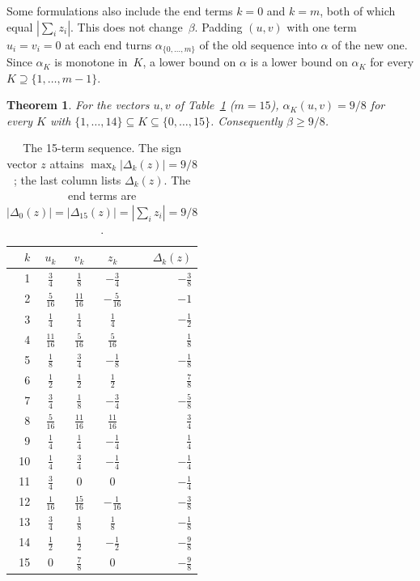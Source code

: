 \documentclass[11pt]{article}
\theoremstyle{plain}
\newtheorem{theorem}{Theorem}
\theoremstyle{definition}
\theoremstyle{remark}
\begin{document}
Some formulations also include the end terms $k=0$ and $k=m$, both of which equal $|\sum_iz_i|$.
This does not change~$\beta$. Padding $(u,v)$ with one term $u_i=v_i=0$ at each end turns $\alpha_{\{0,\dots,m\}}$ of the old sequence into $\alpha$ of the new one.
Since $\alpha_K$ is monotone in~$K$, a lower bound on $\alpha$ is a lower bound on $\alpha_K$ for every $K\supseteq\{1,\dots,m-1\}$.

\begin{theorem}\label{thm:seq}
For the vectors $u,v$ of Table~\ref{tab:seq} ($m=15$), $\alpha_K(u,v)=9/8$ for every $K$ with $\{1,\dots,14\}\subseteq K\subseteq\{0,\dots,15\}$.
Consequently $\beta\ge 9/8$.
\end{theorem}

\begin{table}[t]
\centering
\caption{The 15-term sequence. The sign vector $z$ attains $\max_k|\Delta_k(z)|=9/8$; the last column lists $\Delta_k(z)$. The end terms are $|\Delta_0(z)|=|\Delta_{15}(z)|=|\sum_iz_i|=9/8$.}\label{tab:seq}
\smallskip
\renewcommand{\arraystretch}{1.15}
\begin{tabular}{rcccr}
\toprule
$k$ & $u_k$ & $v_k$ & $z_k$ & $\Delta_k(z)$\\
\midrule
1 & $\tfrac{3}{4}$ & $\tfrac{1}{8}$ & $-\tfrac{3}{4}$ & $-\tfrac{3}{8}$ \\
2 & $\tfrac{5}{16}$ & $\tfrac{11}{16}$ & $-\tfrac{5}{16}$ & $-1$ \\
3 & $\tfrac{1}{4}$ & $\tfrac{1}{4}$ & $\tfrac{1}{4}$ & $-\tfrac{1}{2}$ \\
4 & $\tfrac{11}{16}$ & $\tfrac{5}{16}$ & $\tfrac{5}{16}$ & $\tfrac{1}{8}$ \\
5 & $\tfrac{1}{8}$ & $\tfrac{3}{4}$ & $-\tfrac{1}{8}$ & $-\tfrac{1}{8}$ \\
6 & $\tfrac{1}{2}$ & $\tfrac{1}{2}$ & $\tfrac{1}{2}$ & $\tfrac{7}{8}$ \\
7 & $\tfrac{3}{4}$ & $\tfrac{1}{8}$ & $-\tfrac{3}{4}$ & $-\tfrac{5}{8}$ \\
8 & $\tfrac{5}{16}$ & $\tfrac{11}{16}$ & $\tfrac{11}{16}$ & $\tfrac{3}{4}$ \\
9 & $\tfrac{1}{4}$ & $\tfrac{1}{4}$ & $-\tfrac{1}{4}$ & $\tfrac{1}{4}$ \\
10 & $\tfrac{1}{4}$ & $\tfrac{3}{4}$ & $-\tfrac{1}{4}$ & $-\tfrac{1}{4}$ \\
11 & $\tfrac{3}{4}$ & $0$ & $0$ & $-\tfrac{1}{4}$ \\
12 & $\tfrac{1}{16}$ & $\tfrac{15}{16}$ & $-\tfrac{1}{16}$ & $-\tfrac{3}{8}$ \\
13 & $\tfrac{3}{4}$ & $\tfrac{1}{8}$ & $\tfrac{1}{8}$ & $-\tfrac{1}{8}$ \\
14 & $\tfrac{1}{2}$ & $\tfrac{1}{2}$ & $-\tfrac{1}{2}$ & $-\tfrac{9}{8}$ \\
15 & $0$ & $\tfrac{7}{8}$ & $0$ & $-\tfrac{9}{8}$ \\
\bottomrule
\end{tabular}
\end{table}
\end{document}

